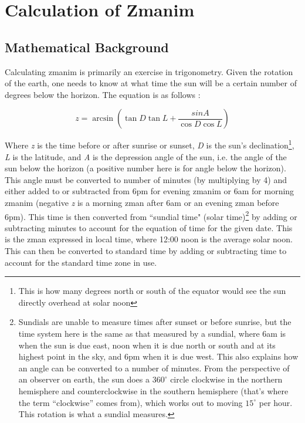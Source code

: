 \chapter{Calculation of Zmanim}

\section{Mathematical Background}

Calculating zmanim is primarily an exercise in trigonometry. Given the rotation of the earth, one needs to know at what time the sun will be a certain number of degrees below the horizon. The equation is as follows \parencite{times}:

\begin{displaymath}
	z = \arcsin\left({\tan{D}\tan{L} + \frac{sin{A}}{\cos{D}\cos{L}}}\right)
\end{displaymath}

Where \textit{z} is the time before or after sunrise or sunset, \textit{D} is the sun's declination\footnote{This is how many degrees north or south of the equator would see the sun directly overhead at solar noon}, \textit{L} is the latitude, and \textit{A} is the depression angle of the sun, i.e. the angle of the sun below the horizon (a positive number here is for angle below the horizon). This angle must be converted to number of minutes (by multiplying by 4) and either added to or subtracted from 6pm for evening zmanim or 6am for morning zmanim (negative \textit{z} is a morning zman after 6am or an evening zman before 6pm). This time is then converted from ``sundial time" (solar time)\footnote{Sundials are unable to measure times after sunset or before sunrise, but the time system here is the same as that measured by a sundial, where 6am is when the sun is due east, noon when it is due north or south and at its highest point in the sky, and 6pm when it is due west. This also explains how an angle can be converted to a number of minutes. From the perspective of an observer on earth, the sun does a $360^{\circ}$ circle clockwise in the northern hemisphere and counterclockwise in the southern hemisphere (that's where the term “clockwise” comes from), which works out to moving $15^{\circ}$ per hour. This rotation is what a sundial measures.} by adding or subtracting minutes to account for the equation of time for the given date. This is the zman expressed in local time, where 12:00 noon is the average solar noon. This can then be converted to standard time by adding or subtracting time to account for the standard time zone in use.

